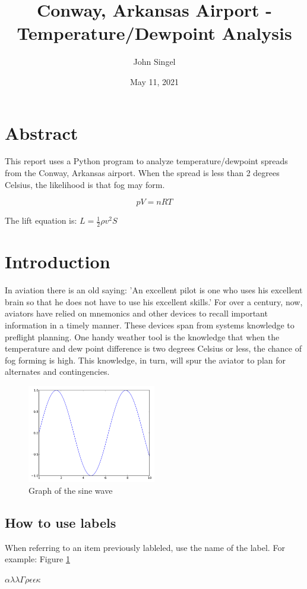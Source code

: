 \documentclass{article}
\title{Conway, Arkansas Airport - Temperature/Dewpoint Analysis}
\author{John Singel}\date{May 11, 2021}
\begin{document}
\maketitle

\section{Abstract}
This report uses a Python program to analyze temperature/dewpoint spreads from the Conway, Arkansas airport. When the spread is less than 2 degrees Celsius, the likelihood is that fog may form.

\begin{equation}
pV = nRT
\end{equation}

The lift equation is: $L=\frac{1}{2}\rho v^2 S$

\section{Introduction}
In aviation there is an old saying: 'An excellent pilot is one who uses his excellent brain so that he does not have to use his excellent skills.' For over a century, now, aviators have relied on mnemonics and other devices to recall important information in a timely manner. These devices span from systems knowledge to preflight planning. One handy weather tool is the knowledge that when the temperature and dew point difference is two degrees Celsius or less, the chance of fog forming is high. This knowledge, in turn, will spur the aviator to plan for alternates and contingencies.

\begin{figure}[h]
\begin{center}
\includegraphics[width=0.5\textwidth]{fig3-1.png}
\end{center}
\caption{Graph of the sine wave}
\label{fig: 3-1}
\end{figure}

\subsection{How to use labels}
When referring to an item previously lableled, use the name of the label. For example: Figure  \ref{fig: 3-1}

$\alpha\lambda\lambda  \Gamma\rho\epsilon\epsilon\kappa$
\end{document}
